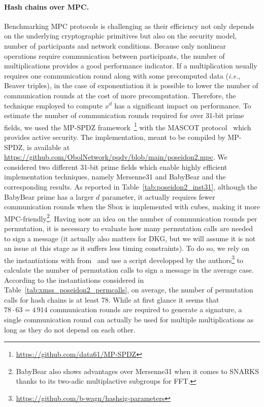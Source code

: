 \paragraph{Hash chains over MPC.}
Benchmarking MPC protocols is challenging as their efficiency not only depends on the underlying cryptographic primitives but also on the security model, number of participants and network conditions.
Because only nonlinear operations require communication between participants, the number of multiplications provides a good performance indicator.
If a multiplication usually requires one communication round along with some precomputed data (\textit{i.e.}, Beaver triples), in the case of exponentiation it is possible to lower the number of communication rounds at the cost of more precomputation.
Therefore, the technique employed to compute $x^d$ has a significant impact on performance.
To estimate the number of communication rounds required for \PoseidonTwoPi over 31-bit prime fields, we used the MP-SPDZ framework~\cite{mp-spdz}\footnote{\url{https://github.com/data61/MP-SPDZ}} with the MASCOT protocol~\cite{mascot} which provides active security.
The \PoseidonTwoPi implementation, meant to be compiled by MP-SPDZ, is available at \url{https://github.com/ObolNetwork/pqdv/blob/main/poseidon2.mpc}.
We considered two different 31-bit prime fields which enable highly efficient implementation techniques, namely Mersenne31 and BabyBear and the corresponding results.
As reported in Table~\ref{tab:poseidon2_inst31}, although the BabyBear prime has a larger $d$ parameter, it actually requires fewer communication rounds when the Sbox is implemented with cubes, making it more MPC-friendly\footnote{BabyBear also shows advantages over Mersenne31 when it comes to SNARKS thanks to its two-adic multiplactive subgroups for FFT.}.
Having now an idea on the number of communication rounds per permutation, it is necessary to evaluate how many permutation calls are needed to sign a message (it actually also matters for DKG, but we will assume it is not an issue at this stage as it suffers less timing constraints).
To do so, we rely on the \XMSS instantiations with \PoseidonTwo from~\cite{cryptoeprint:2025/055} and use a script developped by the authors\footnote{\url{https://github.com/b-wagn/hashsig-parameters}} to calculate the number of permutation calls to sign a message in the average case.
According to the instantiations considered in Table~\ref{tab:xmss_poseidon2_permcalls}, on average, the number of permutation calls for hash chains is at least 78.
While at first glance it seems that $78 \cdot 63 = 4\,914$ communication rounds are required to generate a signature, a single communication round can actually be used for multiple multiplications as long as they do not depend on each other.
